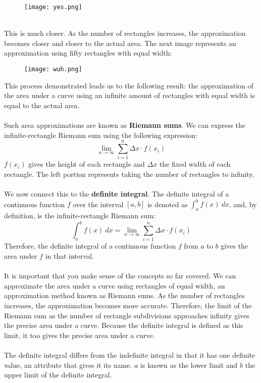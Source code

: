\documentclass[11pt]{scrartcl}
\begin{document}
\begin{figure}[htp]
    \centering
    \texttt{[image: yes.png]}
\end{figure}
\\
\noindent 
This is much closer. As the number of rectangles increases, the approximation becomes closer and closer to the actual area. The next image represents an approximation using fifty rectangles with equal width: 
\begin{figure}[htp]
    \centering
    \texttt{[image: wuh.png]}
\end{figure} 
\newpage 
\noindent 
This process demonstrated leads us to the following result: the approximation of the area under a curve using an infinite amount of rectangles with equal width is equal to the actual area. \\
\\
\noindent 
Such area approximations are known as \textbf{Riemann sums}. We can express the infinite-rectangle Riemann sum using the following expression: 
$$\lim_{n \to \infty} \sum_{i=1}^{n} \Delta x \cdot f(x_i)$$
\noindent 
$f(x_i)$ gives the height of each rectangle and $\Delta x$ the fixed width of each rectangle. The left portion represents taking the number of rectangles to infinity. \\
\\
\noindent 
We now connect this to the \textbf{definite integral}. The definite integral of a continuous function $f$ over the interval $[a,b]$ is denoted as $\int_a^b f(x) \ dx$, and, by definition, is the infinite-rectangle Riemann sum: 
$$\int_a^b f(x) \ dx=\lim_{n \to \infty} \sum_{i=1}^{n} \Delta x \cdot f(x_i)$$
\noindent 
Therefore, the definite integral of a continuous function $f$ from $a$ to $b$ gives the area under $f$ in that interval. \\
\\
\noindent 
It is important that you make sense of the concepts so far covered. We can approximate the area under a curve using rectangles of equal width, an approximation method known as Riemann sums. As the number of rectangles increases, the approximation becomes more accurate. Therefore, the limit of the Riemann sum as the number of rectangle subdivisions approaches infinity gives the precise area under a curve. Because the definite integral is defined as this limit, it too gives the precise area under a curve. \\
\\
\noindent 
The definite integral differs from the indefinite integral in that it has one definite value, an attribute that gives it its name. $a$ is known as the lower limit and $b$ the upper limit of the definite integral. \\
\end{document}
